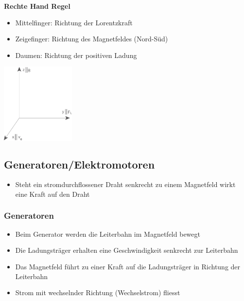 \documentclass[8pt,a4paper]{scrartcl}
\begin{document}
\begin{multicols*}{3}
					\textbf{Rechte Hand Regel}
					\begin{itemize}\itemsep0pt
						\item Mittelfinger: Richtung der Lorentzkraft
						\item Zeigefinger: Richtung des Magnetfeldes (Nord-Süd)
						\item Daumen: Richtung der positiven Ladung
					\end{itemize}		
					
					\includegraphics[height=4cm]{img/lorentzKoord.png} 
				
			\subsection{Generatoren/Elektromotoren}
				\begin{itemize}\itemsep0pt
					\item Steht ein stromdurchflossener Draht senkrecht zu einem Magnetfeld wirkt eine Kraft auf den Draht
				\end{itemize}	
			
					\subsubsection{Generatoren}
						\begin{itemize}\itemsep0pt
							\item Beim Generator werden die Leiterbahn im Magnetfeld bewegt
							\item Die Ladungsträger erhalten eine Geschwindigkeit senkrecht zur Leiterbahn
							\item Das Magnetfeld führt zu einer Kraft auf die Ladungsträger in Richtung der Leiterbahn
							\item Strom mit wechselnder Richtung (Wechselstrom) fliesst
						\end{itemize}

\end{multicols*}
\end{document}
